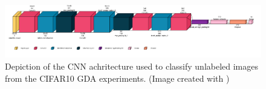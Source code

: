 \begin{figure}[htbp]
    \centering
    \vspace{-2em}
    \includegraphics[width=.9\textwidth]{abb/netron_network_archs/classifying_Classifier_Cifar10.png}
    \caption{Depiction of the CNN achritecture used to classify unlabeled images from the CIFAR10 GDA experiments. (Image created with )}
    \label{fig:figure_class_cifar10}
\end{figure}